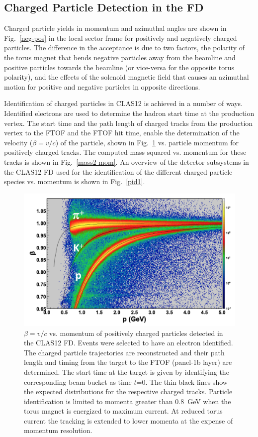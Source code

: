 \documentclass[final,3p]{elsarticle}
\begin{document}
\begin{twocolumn}
\subsection{Charged Particle Detection in the FD}
 
Charged particle yields in momentum and azimuthal angles are shown in Fig.~\ref{neg-pos} in the local sector
frame for positively and negatively charged particles. The difference in the acceptance is due to two factors, the
polarity of the torus magnet that bends negative particles away from the beamline and positive particles towards
the beamline (or vice-versa for the opposite torus polarity), and the effects of the solenoid magnetic field that
causes an azimuthal motion for positive and negative particles in opposite directions. 

Identification of charged particles in CLAS12 is achieved in a number of ways. Identified electrons are used
to determine the hadron start time at the production vertex. The start time and the path length of charged
tracks from the production vertex to the FTOF and the FTOF hit time, enable the determination of the
velocity ($\beta = v/c$) of the particle, shown in Fig.~\ref{pid} vs. particle momentum for positively charged
tracks. The computed mass squared vs. momentum for these tracks is shown in Fig.~\ref{mass2-mom}. An
overview of the detector subsystems in the CLAS12 FD used for the identification of the different charged
particle species vs. momentum is shown in Fig.~\ref{pid1}. 

\begin{figure}[ht!]
\centerline{\includegraphics[width=1.0\columnwidth]{FTOF1b_pid.png}}
\caption{$\beta = v/c $ vs. momentum of positively charged particles detected in the CLAS12 FD. Events were selected
  to have an electron identified. The charged particle trajectories are reconstructed and their path length and timing
  from the target to the FTOF (panel-1b layer) are determined. The start time at the target is given by identifying the
  corresponding beam bucket as time $t$=0. The thin black lines show the expected distributions for the respective
  charged tracks. Particle identification is limited to momenta greater than 0.8~GeV when the torus magnet is energized
  to maximum current. At reduced torus current the tracking is extended to lower momenta at the expense of momentum
  resolution.}
\label{pid}
\end{figure} 


\end{twocolumn}
\end{document}
